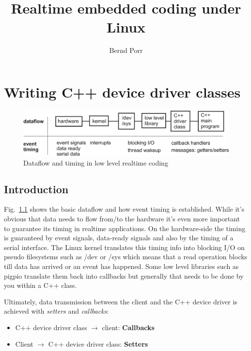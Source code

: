 \documentclass[12pt]{report}
\author{Bernd Porr}
\title{Realtime embedded coding under Linux}
\begin{document}
\maketitle

\tableofcontents

\chapter{Writing C++ device driver classes}

\begin{figure}[!hbt]
\begin{center}
\mbox{\includegraphics[width=\textwidth]{signals-timings}}
\end{center}
\caption{Dataflow and timing in low level realtime coding
\label{timing}}
\end{figure}

\section{Introduction}
Fig.~\ref{timing} shows the basic dataflow and how event timing is
established. While it's obvious that data needs to flow from/to the
hardware it's even more important to guarantee its timing in realtime
applications. On the hardware-side the timing is guaranteed by event
signals, data-ready signals and also by the timing of a serial
interface. The Linux kernel translates this timing info into blocking
I/O on pseudo filesystems such as /dev or /sys which means that a read
operation blocks till data has arrived or an event has happened. Some
low level libraries such as pigpio translate them back into callbacks
but generally that needs to be done by you within a C++ class.

Ultimately, data transmission between the client and the C++ device
driver is achieved with \textsl{setters} and \textsl{callbacks}:
\begin{itemize}
\item C++ device driver class $\to$ client: \textbf{Callbacks}
\item Client $\to$ C++ device driver class: \textbf{Setters}
\end{itemize}
\end{document}
